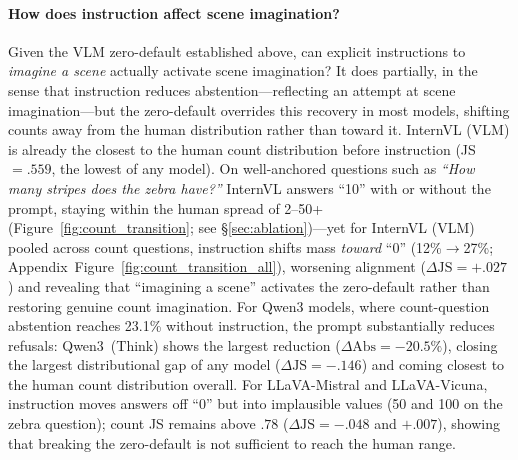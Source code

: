 \documentclass[letterpaper]{article}
\begin{document}
\paragraph{How does instruction affect scene imagination?} 
Given the VLM zero-default established above, can explicit instructions to \emph{imagine a scene} actually activate scene imagination?
It does partially, in the sense that instruction reduces abstention---reflecting an attempt at scene imagination---but the zero-default overrides this recovery in most models, shifting counts away from the human distribution rather than toward it.
InternVL (VLM) is already the closest to the human count distribution before instruction (JS$=.559$, the lowest of any model). On well-anchored questions such as \emph{``How many stripes does the zebra have?''} InternVL answers ``10'' with or without the prompt, staying within the human spread of 2--50+ (Figure~\ref{fig:count_transition}; see \S\ref{sec:ablation})---yet for InternVL (VLM) pooled across count questions, instruction shifts mass \emph{toward} ``0'' (12\%$\to$27\%; Appendix~Figure~\ref{fig:count_transition_all}), worsening alignment ($\Delta\mathrm{JS}{=}{+}.027$) and revealing that ``imagining a scene'' activates the zero-default rather than restoring genuine count imagination.
For Qwen3 models, where count-question abstention reaches 23.1\% without instruction, the prompt substantially reduces refusals: Qwen3~(Think) shows the largest reduction ($\Delta\mathrm{Abs}{=}{-}20.5\%$), closing the largest distributional gap of any model ($\Delta\mathrm{JS}{=}{-}.146$) and coming closest to the human count distribution overall.
For LLaVA-Mistral and LLaVA-Vicuna, instruction moves answers off ``0'' but into implausible values (50 and 100 on the zebra question); count JS remains above $.78$ ($\Delta\mathrm{JS}{=}{-}.048$ and $+.007$), showing that breaking the zero-default is not sufficient to reach the human range.

\end{document}

